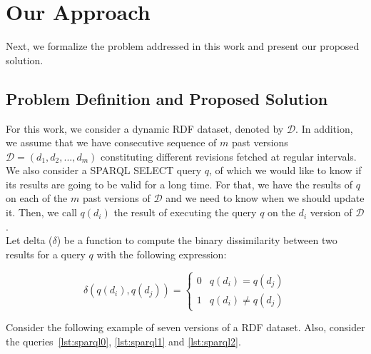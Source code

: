 \documentclass[runningheads]{llncs}
\begin{document}
\section{Our Approach}
\label{sec:approach}

Next, we formalize the problem addressed in this work and present our proposed solution.

\subsection{Problem Definition and Proposed Solution}

For this work, we consider a dynamic RDF dataset, denoted by $\mathcal{D}$. In addition, we assume that we have consecutive sequence of $m$ past versions $\mathcal{D} = (d_1, d_2, ..., d_m)$ constituting different revisions fetched at regular intervals. We also consider a SPARQL SELECT query $q$, of which we would like to know if its results are going to be valid for a long time. For that, we have the results of $q$ on each of the $m$ past versions of $\mathcal{D}$ and we need to know when we should update it. Then, we call $q(d_i)$ the result of executing the query $q$ on the $d_i$ version of $\mathcal{D}$.\\

Let delta ($\delta$) be a function to compute the binary dissimilarity between two results for a query $q$ with the following expression:

\begin{equation}
\label{eq:delta}
\delta(q(d_i), q(d_j)) = \begin{cases}
0 & q(d_i) = q(d_j) \\
1 & q(d_i) \neq q(d_j) 
\end{cases}
\end{equation}

\begin{example}
	\label{ex:dataset}    
	Consider the following example of seven versions of a RDF dataset. Also, consider the queries~\ref{lst:sparql0}, \ref{lst:sparql1} and \ref{lst:sparql2}.
\end{example}
\end{document}
